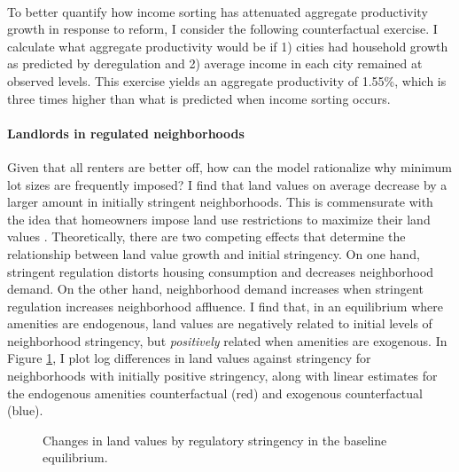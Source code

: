 \documentclass[11pt]{article}
\begin{document}
\paragraph*{}
To better quantify how income sorting has attenuated aggregate productivity growth in response to reform, I consider the following counterfactual exercise. I calculate what aggregate productivity would be if 1) cities had household growth as predicted by deregulation and 2) average income in each city remained at observed levels. This exercise yields an aggregate productivity of 1.55\%, which is three times higher than what is predicted when income sorting occurs.

\paragraph*{Landlords in regulated neighborhoods}
Given that all renters are better off, how can the model rationalize why minimum lot sizes are frequently imposed? I find that land values on average decrease by a larger amount in initially stringent neighborhoods. This is commensurate with the idea that homeowners impose land use restrictions to maximize their land values \citep{parkho, HILBER2013, homevoterhypothesis}. Theoretically, there are two competing effects that determine the relationship between land value growth and initial stringency. On one hand, stringent regulation distorts housing consumption and decreases neighborhood demand. On the other hand, neighborhood demand increases when stringent regulation increases neighborhood affluence. I find that, in an equilibrium where amenities are endogenous, land values are negatively related to initial levels of neighborhood stringency, but \textit{positively} related when amenities are exogenous. In Figure \ref{figure:landlords}, I plot log differences in land values against stringency for neighborhoods with initially positive stringency, along with linear estimates for the endogenous amenities counterfactual (red) and exogenous counterfactual (blue). 


\begin{figure}[htbp!]
	
	
	\caption{Changes in land values by regulatory stringency in the baseline equilibrium.}\label{figure:landlords}
	
\end{figure}
\end{document}

